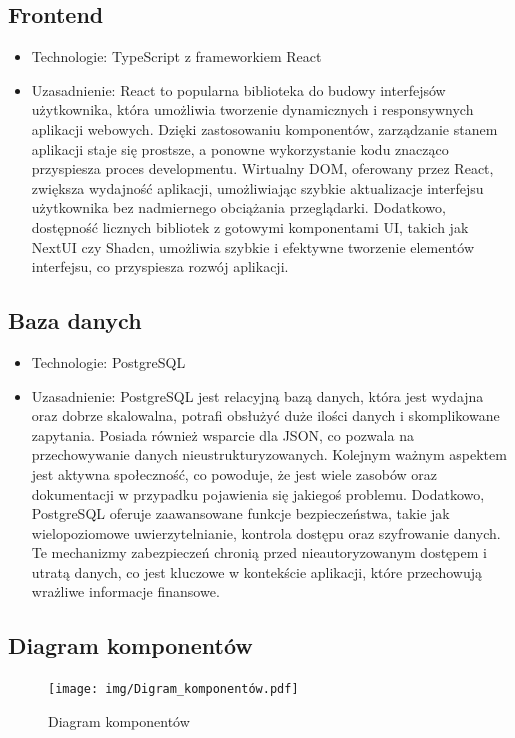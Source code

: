 \documentclass[12pt,titlepage]{article}
\begin{document}
\subsection{Frontend}
\begin{itemize}
    \item Technologie: TypeScript z frameworkiem React
    \item Uzasadnienie: React to popularna biblioteka do budowy interfejsów użytkownika, która umożliwia tworzenie dynamicznych i responsywnych aplikacji webowych. Dzięki zastosowaniu komponentów, zarządzanie stanem aplikacji staje się prostsze, a ponowne wykorzystanie kodu znacząco przyspiesza proces developmentu. Wirtualny DOM, oferowany przez React, zwiększa wydajność aplikacji, umożliwiając szybkie aktualizacje interfejsu użytkownika bez nadmiernego obciążania przeglądarki. Dodatkowo, dostępność licznych bibliotek z gotowymi komponentami UI, takich jak NextUI czy Shadcn, umożliwia szybkie i efektywne tworzenie elementów interfejsu, co przyspiesza rozwój aplikacji.
\end{itemize}

\subsection{Baza danych}
\begin{itemize}
    \item Technologie: PostgreSQL
    \item Uzasadnienie: PostgreSQL jest relacyjną bazą danych, która jest wydajna oraz dobrze skalowalna, potrafi obsłużyć duże ilości danych i skomplikowane zapytania. Posiada również wsparcie dla JSON, co pozwala na przechowywanie danych nieustrukturyzowanych. Kolejnym ważnym aspektem jest aktywna społeczność, co powoduje, że jest wiele zasobów oraz dokumentacji w przypadku pojawienia się jakiegoś problemu. Dodatkowo, PostgreSQL oferuje zaawansowane funkcje bezpieczeństwa, takie jak wielopoziomowe uwierzytelnianie, kontrola dostępu oraz szyfrowanie danych. Te mechanizmy zabezpieczeń chronią przed nieautoryzowanym dostępem i utratą danych, co jest kluczowe w kontekście aplikacji, które przechowują wrażliwe informacje finansowe.
\end{itemize}


\newpage
\subsection{Diagram komponentów}

\begin{figure}[!h]
    \centering
    \texttt{[image: img/Digram\_komponentów.pdf]}
    \caption{Diagram komponentów}
    \label{fig:mesh1}
\end{figure}
\newpage
\end{document}
